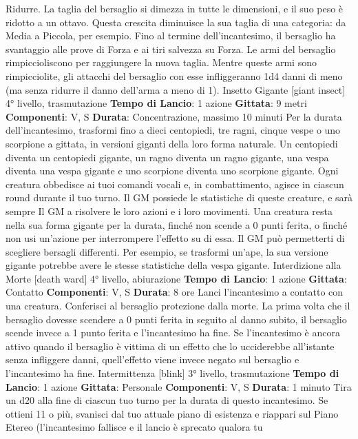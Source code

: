 \begin{multicols}{2}
Ridurre. La taglia del bersaglio si dimezza in tutte le
dimensioni, e il suo peso è ridotto a un ottavo. Questa
crescita diminuisce la sua taglia di una categoria: da
Media a Piccola, per esempio. Fino al termine
dell’incantesimo, il bersaglio ha svantaggio alle prove di
Forza e ai tiri salvezza su Forza. Le armi del bersaglio
rimpiccioliscono per raggiungere la nuova taglia. Mentre
queste armi sono rimpicciolite, gli attacchi del bersaglio
con esse infliggeranno 1d4 danni di meno (ma senza
ridurre il danno dell’arma a meno di 1).
Insetto Gigante
[giant insect]
4° livello, trasmutazione
\textbf{Tempo di Lancio}: 1 azione
\textbf{Gittata}: 9 metri
\textbf{Componenti}: V, S
\textbf{Durata}: Concentrazione, massimo 10 minuti
Per la durata dell’incantesimo, trasformi fino a dieci
centopiedi, tre ragni, cinque vespe o uno scorpione a
gittata, in versioni giganti della loro forma naturale. Un
centopiedi diventa un centopiedi gigante, un ragno
diventa un ragno gigante, una vespa diventa una vespa
gigante e uno scorpione diventa uno scorpione gigante.
Ogni creatura obbedisce ai tuoi comandi vocali e, in
combattimento, agisce in ciascun round durante il tuo
turno. Il GM possiede le statistiche di queste creature, e
sarà sempre Il GM a risolvere le loro azioni e i loro
movimenti.
Una creatura resta nella sua forma gigante per la
durata, finché non scende a 0 punti ferita, o finché non
usi un’azione per interrompere l’effetto su di essa.
Il GM può permetterti di scegliere bersagli differenti. Per
esempio, se trasformi un’ape, la sua versione gigante
potrebbe avere le stesse statistiche della vespa
gigante.
Interdizione alla Morte
[death ward]
4° livello, abiurazione
\textbf{Tempo di Lancio}: 1 azione
\textbf{Gittata}: Contatto
\textbf{Componenti}: V, S
\textbf{Durata}: 8 ore
Lanci l’incantesimo a contatto con una creatura.
Conferisci al bersaglio protezione dalla morte.
La prima volta che il bersaglio dovesse scendere a 0
punti ferita in seguito al danno subito, il bersaglio
scende invece a 1 punto ferita e l’incantesimo ha fine.
Se l’incantesimo è ancora attivo quando il bersaglio è
vittima di un effetto che lo ucciderebbe all’istante senza
infliggere danni, quell’effetto viene invece negato sul
bersaglio e l’incantesimo ha fine.
Intermittenza
[blink]
3° livello, trasmutazione
\textbf{Tempo di Lancio}: 1 azione
\textbf{Gittata}: Personale
\textbf{Componenti}: V, S
\textbf{Durata}: 1 minuto
Tira un d20 alla fine di ciascun tuo turno per la durata di
questo incantesimo. Se ottieni 11 o più, svanisci dal tuo
attuale piano di esistenza e riappari sul Piano Etereo
(l’incantesimo fallisce e il lancio è sprecato qualora tu

\end{multicols}
